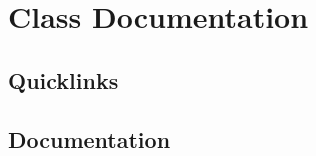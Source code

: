 \documentclass[10pt,a4paper]{article}
\begin{document}
\section{Class Documentation}

\subsection{Quicklinks}

\subsection{Documentation}


\end{document}
